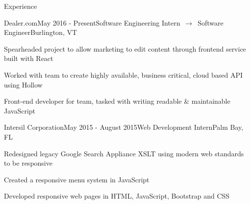 \documentclass{resume} %
\begin{document}
\begin{rSection}{Experience}


\begin{rSubsection}{Dealer.com}{May 2016 - Present}{Software Engineering Intern~$\rightarrow$~Software Engineer}{Burlington, VT}

\item Spearheaded project to allow marketing to edit content through frontend service built with React
\item Worked with team to create highly available, business critical, cloud based API using Hollow
\item Front-end developer for team, tasked with writing readable \& maintainable JavaScript

\end{rSubsection}


\begin{rSubsection}{Intersil Corporation}{May 2015 - August 2015}{Web Development Intern}{Palm Bay, FL}

\item Redesigned  legacy Google Search Appliance XSLT using modern web standards to be responsive
\item Created a responsive menu system in JavaScript
\item Developed responsive web pages in HTML, JavaScript, Bootstrap and CSS


\end{rSubsection}
\end{rSection}
\end{document}
